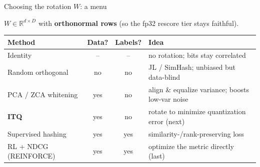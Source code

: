 \documentclass[aspectratio=169,12pt]{beamer}
\begin{document}
\begin{frame}{Choosing the rotation $W$: a menu}

$W \in \mathbb{R}^{d\times D}$ with \textbf{orthonormal rows} (so the fp32 rescore tier stays faithful).

\vspace{4pt}
\begin{center}\footnotesize
\begin{tabular}{lccl}
\toprule
Method & Data? & Labels? & Idea \\
\midrule
Identity              & --  & --  & no rotation; bits stay correlated \\
Random orthogonal     & no  & no  & JL / SimHash; unbiased but data-blind \\
PCA / ZCA whitening   & yes & no  & align \& equalize variance; boosts low-var noise \\
\textbf{ITQ}          & yes & no  & rotate to minimize quantization error (next) \\
Supervised hashing    & yes & yes & similarity-/rank-preserving loss \\
RL + NDCG (REINFORCE) & yes & yes & optimize the metric directly (last) \\
\bottomrule
\end{tabular}
\end{center}

\vspace{6pt}
\end{frame}
\end{document}
